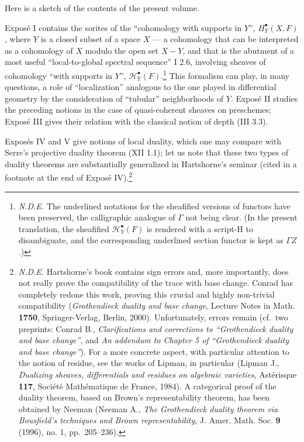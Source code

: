 \documentclass[
  11pt,
  a4paper,
]{book}
\begin{document}
Here is a sketch of the contents of the present volume.

Exposé I contains the sorites of the ``cohomology with supports in
\(Y\)'', \(H^{\bullet}_{Y}(X, F)\), where \(Y\) is a closed subset of a
space \(X\) --- a cohomology that can be interpreted as a cohomology of
\(X\) modulo the open set \(X - Y\), and that is the abutment of a most
useful ``local-to-global spectral sequence'' I 2.6, involving sheaves of
cohomology ``with supports in \(Y\)'',
\(\mathcal{H}^{\bullet}_{Y}(F)\).\footnote{\emph{N.D.E.} The underlined
  notations for the sheafified versions of functors have been preserved,
  the calligraphic analogue of \(\Gamma\) not being clear. (In the
  present translation, the sheafified \(\mathcal{H}^{\bullet}_{Y}(F)\)
  is rendered with a script-H to disambiguate, and the corresponding
  underlined section functor is kept as \(\Gamma Z\).)} This formalism
can play, in many questions, a role of ``localization'' analogous to the
one played in differential geometry by the consideration of ``tubular''
neighborhoods of \(Y\). Exposé II studies the preceding notions in the
case of quasi-coherent sheaves on preschemes; Exposé III gives their
relation with the classical notion of depth (III 3.3).

Exposés IV and V give notions of local duality, which one may compare
with Serre's projective duality theorem (XII 1.1); let us note that
these two types of duality theorems are substantially generalized in
Hartshorne's seminar (cited in a footnote at the end of Exposé
IV).\footnote{\emph{N.D.E.} Hartshorne's book contains sign errors and,
  more importantly, does not really prove the compatibility of the trace
  with base change. Conrad has completely redone this work, proving this
  crucial and highly non-trivial compatibility (\emph{Grothendieck
  duality and base change}, Lecture Notes in Math. \textbf{1750},
  Springer-Verlag, Berlin, 2000). Unfortunately, errors remain (cf.~two
  preprints: Conrad B., \emph{Clarifications and corrections to
  ``Grothendieck duality and base change''}, and \emph{An addendum to
  Chapter 5 of ``Grothendieck duality and base change''}). For a more
  concrete aspect, with particular attention to the notion of residue,
  see the works of Lipman, in particular (Lipman J., \emph{Dualizing
  sheaves, differentials and residues on algebraic varieties},
  Astérisque \textbf{117}, Société Mathématique de France, 1984). A
  categorical proof of the duality theorem, based on Brown's
  representability theorem, has been obtained by Neeman (Neeman A.,
  \emph{The Grothendieck duality theorem via Bousfield's techniques and
  Brown representability}, J. Amer. Math. Soc. \textbf{9} (1996), no. 1,
  pp.~205--236).}
\end{document}
